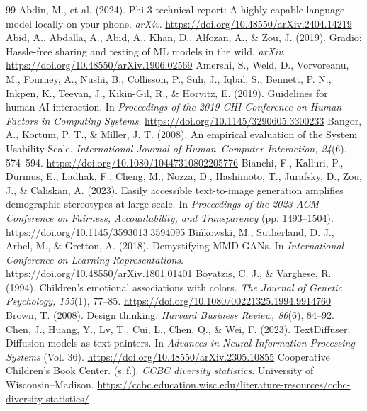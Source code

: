 \documentclass[10pt,a4paper,twocolumn]{article}
\begin{document}
{\scriptsize
\setlength{\bibsep}{1pt}
\begin{thebibliography}{99}
 Abdin, M., et al. (2024). Phi-3 technical report: A highly capable language model locally on your phone. \emph{arXiv}. \url{https://doi.org/10.48550/arXiv.2404.14219}
 Abid, A., Abdalla, A., Abid, A., Khan, D., Alfozan, A., \& Zou, J. (2019). Gradio: Hassle-free sharing and testing of ML models in the wild. \emph{arXiv}. \url{https://doi.org/10.48550/arXiv.1906.02569}
 Amershi, S., Weld, D., Vorvoreanu, M., Fourney, A., Nushi, B., Collisson, P., Suh, J., Iqbal, S., Bennett, P. N., Inkpen, K., Teevan, J., Kikin-Gil, R., \& Horvitz, E. (2019). Guidelines for human-AI interaction. In \emph{Proceedings of the 2019 CHI Conference on Human Factors in Computing Systems}. \url{https://doi.org/10.1145/3290605.3300233}
 Bangor, A., Kortum, P. T., \& Miller, J. T. (2008). An empirical evaluation of the System Usability Scale. \emph{International Journal of Human--Computer Interaction, 24}(6), 574--594. \url{https://doi.org/10.1080/10447310802205776}
 Bianchi, F., Kalluri, P., Durmus, E., Ladhak, F., Cheng, M., Nozza, D., Hashimoto, T., Jurafsky, D., Zou, J., \& Caliskan, A. (2023). Easily accessible text-to-image generation amplifies demographic stereotypes at large scale. In \emph{Proceedings of the 2023 ACM Conference on Fairness, Accountability, and Transparency} (pp. 1493--1504). \url{https://doi.org/10.1145/3593013.3594095}
 Bińkowski, M., Sutherland, D. J., Arbel, M., \& Gretton, A. (2018). Demystifying MMD GANs. In \emph{International Conference on Learning Representations}. \url{https://doi.org/10.48550/arXiv.1801.01401}
 Boyatzis, C. J., \& Varghese, R. (1994). Children's emotional associations with colors. \emph{The Journal of Genetic Psychology, 155}(1), 77--85. \url{https://doi.org/10.1080/00221325.1994.9914760}
 Brown, T. (2008). Design thinking. \emph{Harvard Business Review, 86}(6), 84--92.
 Chen, J., Huang, Y., Lv, T., Cui, L., Chen, Q., \& Wei, F. (2023). TextDiffuser: Diffusion models as text painters. In \emph{Advances in Neural Information Processing Systems} (Vol. 36). \url{https://doi.org/10.48550/arXiv.2305.10855}
 Cooperative Children's Book Center. (s.\,f.). \emph{CCBC diversity statistics}. University of Wisconsin--Madison. \url{https://ccbc.education.wisc.edu/literature-resources/ccbc-diversity-statistics/}

\end{thebibliography}}
\end{document}
